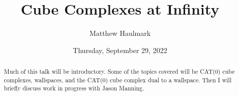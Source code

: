 \documentclass{UAmathtalk}
\author{Matthew Haulmark}
\title{Cube Complexes at Infinity}
\date{Thursday, September 29, 2022}
\begin{document}
\maketitle

\begin{abstract}
Much of this talk will be introductory. Some of the topics covered will be CAT(0) cube complexes, wallspaces, and the CAT(0) cube complex dual to a wallspace. Then I will briefly discuss work in progress with Jason Manning.
\end{abstract}
\end{document}
